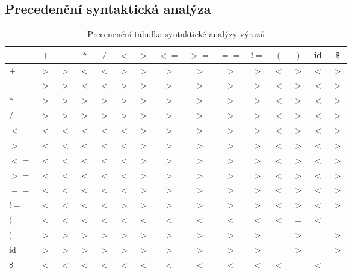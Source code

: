 \documentclass[a4paper, 11pt, titlepage]{article}
\begin{document}
\subsection{Precedenční syntaktická analýza}
\begin{table}[h]
	\begin{center}
	\begin{tabular}{l | c c c c c c c c c c c c c c}
			  & $+$ & $-$ & $*$ & $/$ & $<$ & $>$ & $<=$& $>=$& $==$ & !$=$ &  $($   &  $)$   &  id  &    \$ \\ \hline
		$+$   & $>$ & $>$ & $<$ & $<$ & $>$ & $>$ & $>$ & $>$ & $>$  & $>$  & $<$  & $>$  & $<$  & $>$ \\
		$-$   & $>$ & $>$ & $<$ & $<$ & $>$ & $>$ & $>$ & $>$ & $>$  & $>$  & $<$  & $>$  & $<$  & $>$ \\
		$*$   & $>$ & $>$ & $>$ & $>$ & $>$ & $>$ & $>$ & $>$ & $>$  & $>$  & $<$  & $>$  & $<$  & $>$ \\
		$/$   & $>$ & $>$ & $>$ & $>$ & $>$ & $>$ & $>$ & $>$ & $>$  & $>$  & $<$  & $>$  & $<$  & $>$ \\
		$<$   & $<$ & $<$ & $<$ & $<$ & $<$ & $>$ & $>$ & $>$ & $>$  & $>$  & $<$  & $>$  & $<$  & $>$ \\
		$>$   & $<$ & $<$ & $<$ & $<$ & $<$ & $>$ & $>$ & $>$ & $>$  & $>$  & $<$  & $>$  & $<$  & $>$ \\
		$<=$  & $<$ & $<$ & $<$ & $<$ & $<$ & $>$ & $>$ & $>$ & $>$  & $>$  & $<$  & $>$  & $<$  & $>$ \\
		$>=$  & $<$ & $<$ & $<$ & $<$ & $<$ & $>$ & $>$ & $>$ & $>$  & $>$  & $<$  & $>$  & $<$  & $>$ \\
		$==$  & $<$ & $<$ & $<$ & $<$ & $<$ & $>$ & $>$ & $>$ & $>$  & $>$  & $<$  & $>$  & $<$  & $>$ \\
		!$=$  & $<$ & $<$ & $<$ & $<$ & $>$ & $>$ & $>$ & $>$ & $>$  & $>$  & $<$  & $>$  & $<$  & $>$ \\
		$($   & $<$ & $<$ & $<$ & $<$ & $<$ & $<$ & $<$ & $<$ & $<$  & $<$  & $<$  & $=$  & $<$  &     \\
		$)$   & $>$ & $>$ & $>$ & $>$ & $>$ & $>$ & $>$ & $>$ & $>$  & $>$  &      & $>$  &      & $>$ \\
		id    & $>$ & $>$ & $>$ & $>$ & $>$ & $>$ & $>$ & $>$ & $>$  & $>$  &      & $>$  &      & $>$ \\
		\$    & $<$ & $<$ & $<$ & $<$ & $<$ & $<$ & $<$ & $<$ & $<$  & $<$  & $<$  &      & $<$  &     \\ \hline
	\end{tabular}
	\caption{Precenenční tabulka syntaktické analýzy výrazů}
	\label{table_2:PA}
	\end{center}
\end{table}
\end{document}
